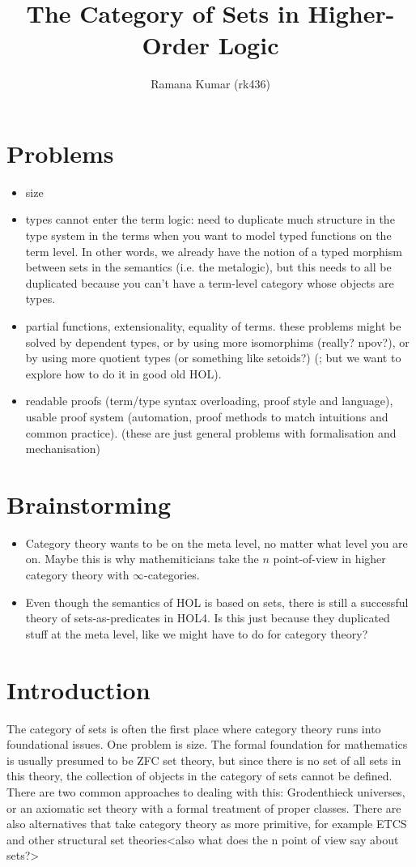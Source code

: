 \documentclass{article}
\title{The Category of Sets in Higher-Order Logic}
\author{Ramana Kumar (rk436)}
\begin{document}
\maketitle

\section{Problems}
\begin{itemize}
\item size
\item types cannot enter the term logic: need to duplicate much structure in the type system in the terms when you want to model typed functions on the term level.
In other words, we already have the notion of a typed morphism between sets in the semantics (i.e. the metalogic), but this needs to all be duplicated because you can't have a term-level category whose objects are types.
\item partial functions, extensionality, equality of terms.
these problems might be solved by dependent types, or by using more isomorphims (really? npov?), or by using more quotient types (or something like setoids?) (; but we want to explore how to do it in good old HOL).
\item readable proofs (term/type syntax overloading, proof style and language), usable proof system (automation, proof methods to match intuitions and common practice). (these are just general problems with formalisation and mechanisation)
\end{itemize}

\section{Brainstorming}
\begin{itemize}
\item Category theory wants to be on the meta level, no matter what level you are on. Maybe this is why mathemiticians take the $n$ point-of-view in higher category theory with $\infty$-categories.
\item Even though the semantics of HOL is based on sets, there is still a successful theory of sets-as-predicates in HOL4. Is this just because they duplicated stuff at the meta level, like we might have to do for category theory?
\end{itemize}

\section{Introduction}
The category of sets is often the first place where category theory runs into foundational issues.
One problem is size.
The formal foundation for mathematics is usually presumed to be ZFC set theory, but since there is no set of all sets in this theory, the collection of objects in the category of sets cannot be defined.
There are two common approaches to dealing with this: Grodenthieck universes, or an axiomatic set theory with a formal treatment of proper classes.
There are also alternatives that take category theory as more primitive, for example ETCS and other structural set theories<also what does the n point of view say about sets?>
\end{document}
